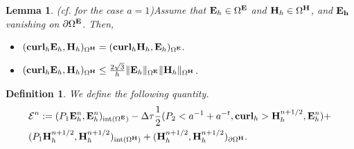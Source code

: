 \documentclass[12pt,reqno]{amsart}
\newcommand{\curl}{{\bf curl}}
\newcommand{\e}{{\bf E}}
\newcommand{\h}{{\bf H}}
\newcommand{\p}{{\bf P}}
\newtheorem{lemma}[theorem]{Lemma}
\newtheorem{defi}[theorem]{Definition}
\theoremstyle{definition}
\numberwithin{equation}{section}
\newcommand{\intr}[1]{\mathrm{int}(#1)}
\def\Gw{\Omega}     \def\Gx{\Xi}         \def\Gy{\Psi}
\begin{document}
\begin{lemma}(cf. \cite[(37)]{sakka} for the case $a=1$)\label{lem:sym}
	Assume that $\e_h\in \Gw^\e$ and $\h_h\in \Gw^\h$, and
	$\bf{E}_h$ vanishing on $\partial \Gw^{\bf{E}}$. Then,
	\begin{itemize}
		\item  
		$
		(\curl_h\e_h,\h_h)_{\Gw^\h}=
		(\curl_h\h_h,\e_h)_{\Gw^\e}.
		$\\[1mm]
		\item $(\curl _h\e_h,\h_h)_{\Gw^\h}\leq
		  \frac{2\sqrt{3}}{h}\|\e_h\|_{\Gw^\e}
		\|\h_h\|_{\Gw^\h}
		$.

	\end{itemize}

\end{lemma}
%    
\begin{defi}
	We define the following quantity.
	\begin{align*}
	&
	\mathcal{E}^{n}:=
	(P_1\e_h^{n},\e_h^{n})_{\intr{\Gw^\e}}
	-\Delta \tau\frac{1}{2} (P_2<a^{-1}+a^{-t},\curl_h>\h_h^{n+1/2},\e_h^n)+\\&
	(P_1\h_h^{n+1/2},\h_h^{n+1/2})_{\intr{\Gw^\h}}+
	(\h_h^{n+1/2},\h_h^{n+1/2})_{\partial \Gw^{\h}}.
\end{align*}
\end{defi}
\end{document}
